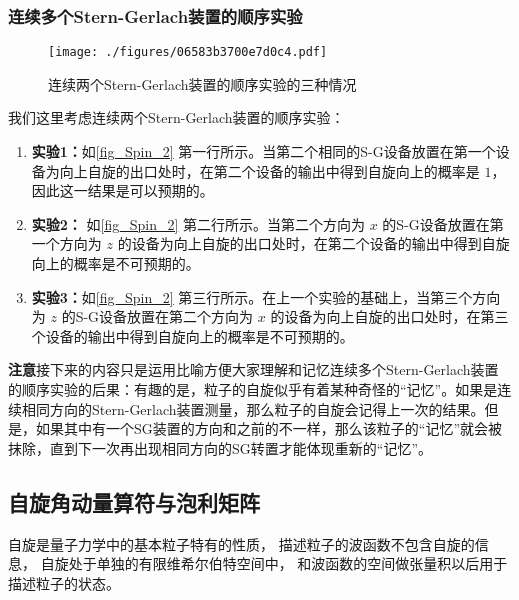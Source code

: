 \subsubsection{连续多个Stern-Gerlach装置的顺序实验}
\begin{figure}[ht]
\centering
\texttt{[image: ./figures/06583b3700e7d0c4.pdf]}
\caption{连续两个Stern-Gerlach装置的顺序实验的三种情况} \label{fig_Spin_2}
\end{figure}
我们这里考虑连续两个Stern-Gerlach装置的顺序实验：
\begin{enumerate}
\item \textbf{实验1：}如\autoref{fig_Spin_2} 第一行所示。当第二个相同的S-G设备放置在第一个设备为向上自旋的出口处时，在第二个设备的输出中得到自旋向上的概率是 $1$，因此这一结果是可以预期的。

\item  \textbf{实验2：} 如\autoref{fig_Spin_2} 第二行所示。当第二个方向为 $x$ 的S-G设备放置在第一个方向为 $z$ 的设备为向上自旋的出口处时，在第二个设备的输出中得到自旋向上的概率是不可预期的。

\item  \textbf{实验3：}如\autoref{fig_Spin_2} 第三行所示。在上一个实验的基础上，当第三个方向为 $z$ 的S-G设备放置在第二个方向为 $x$ 的设备为向上自旋的出口处时，在第三个设备的输出中得到自旋向上的概率是不可预期的。
\end{enumerate}

\textbf{注意}接下来的内容只是运用比喻方便大家理解和记忆连续多个Stern-Gerlach装置的顺序实验的后果：有趣的是，粒子的自旋似乎有着某种奇怪的“记忆”。如果是连续相同方向的Stern-Gerlach装置测量，那么粒子的自旋会记得上一次的结果。但是，如果其中有一个SG装置的方向和之前的不一样，那么该粒子的“记忆”就会被抹除，直到下一次再出现相同方向的SG转置才能体现重新的“记忆”。

\subsection{自旋角动量算符与泡利矩阵}

自旋是量子力学中的基本粒子特有的性质， 描述粒子的波函数不包含自旋的信息， 自旋处于单独的有限维希尔伯特空间中， 和波函数的空间做张量积以后用于描述粒子的状态。


